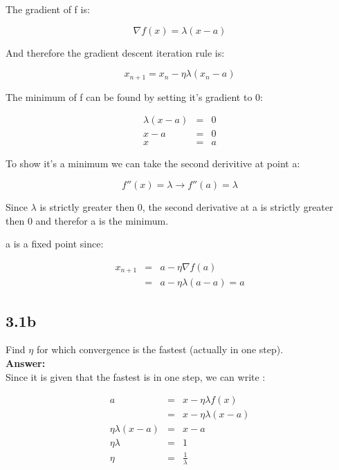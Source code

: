 \documentclass[a4paper]{article}
\begin{document}
The gradient of f is:

\begin{equation}
\nabla f(x) = \lambda (x-a)
\end{equation}

And therefore the gradient descent iteration rule is:

\begin{equation}
x_{n+1} = x_n - \eta \lambda (x_n-a)
\end{equation}

The minimum of f can be found by setting it's gradient to 0:

\begin{eqnarray}
\lambda(x-a) &=& 0\\
x-a &=& 0 \\
x &=& a
\end{eqnarray}

To show it's a minimum we can take the second derivitive at point a:

\begin{equation}
f''(x) = \lambda \rightarrow f''(a) = \lambda
\end{equation}

Since $\lambda$ is strictly greater then 0, the second derivative at a is strictly greater then 0 and therefor a is the minimum.

a is a fixed point since:

\begin{eqnarray}
x_{n+1} &=& a - \eta \nabla f(a)\\
&=& a - \eta \lambda (a-a) = a
\end{eqnarray}

\subsection*{3.1b}

Find $\eta$ for which convergence is the fastest (actually in one step).\\

\textbf{Answer:}\\

Since it is given that the fastest is in one step, we can write :

\begin{eqnarray}
a &=& x - \eta \lambda f(x)\\
&=& x - \eta \lambda (x-a)\\
\eta \lambda (x-a) &=& x - a\\
\eta \lambda &=& 1\\
\eta &=& \frac{1}{\lambda}
\end{eqnarray}
\end{document}
